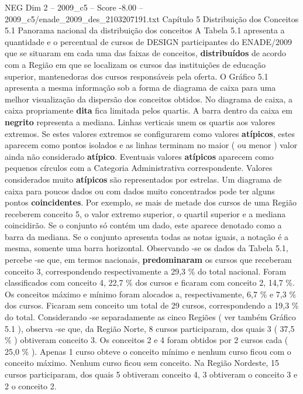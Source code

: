 \begin{textsample}{NEG Dim 2 – 2009\_c5 – Score -8.00 – 2009\_c5/enade\_2009\_des\_2103207191.txt}  \label{ex:f2_neg_008}
Capítulo 5 Distribuição dos Conceitos 5.1 Panorama nacional da distribuição dos conceitos A Tabela 5.1 apresenta a quantidade e o percentual de cursos de DESIGN participantes do ENADE/2009 que se situaram em cada uma das faixas de conceitos, \textbf{distribuídos} de acordo com a Região em que se localizam os cursos das instituições de educação superior, mantenedoras dos cursos responsáveis pela oferta.
O Gráfico 5.1 apresenta a mesma informação sob a forma de diagrama de caixa para uma melhor visualização da dispersão dos conceitos obtidos.
No diagrama de caixa, a caixa propriamente \textbf{dita} fica limitada pelos quartis.
A barra dentro da caixa em \textbf{negrito} representa a mediana.
Linhas verticais unem os quartis aos valores extremos.
Se estes valores extremos se configurarem como valores \textbf{atípicos}, estes aparecem como pontos isolados e as linhas terminam no maior ( ou menor ) valor ainda não considerado \textbf{atípico}.
Eventuais valores \textbf{atípicos} aparecem como pequenos círculos com a Categoria Administrativa correspondente.
Valores considerados muito \textbf{atípicos} são representados por estrelas.
Um diagrama de caixa para poucos dados ou com dados muito concentrados pode ter alguns pontos \textbf{coincidentes}.
Por exemplo, se mais de metade dos cursos de uma Região receberem conceito 5, o valor extremo superior, o quartil superior e a mediana coincidirão.
Se o conjunto só contém um dado, este aparece denotado como a barra da mediana.
Se o conjunto apresenta todas as notas iguais, a notação é a mesma, somente uma barra horizontal.
Observando -se os dados da Tabela 5.1, percebe -se que, em termos nacionais, \textbf{predominaram} os cursos que receberam conceito 3, correspondendo respectivamente a 29,3 \% do total nacional.
Foram classificados com conceito 4, 22,7 \% dos cursos e ficaram com conceito 2, 14,7 \%.
Os conceitos máximo e mínimo foram alocados a, respectivamente, 6,7 \% e 7,3 \% dos cursos.
Ficaram sem conceito um total de 29 cursos, correspondendo a 19,3 \% do total.
Considerando -se separadamente as cinco Regiões ( ver também Gráfico 5.1 ), observa -se que, da Região Norte, 8 cursos participaram, dos quais 3 ( 37,5 \% ) obtiveram conceito 3.
Os conceitos 2 e 4 foram obtidos por 2 cursos cada ( 25,0 \% ).
Apenas 1 curso obteve o conceito mínimo e nenhum curso ficou com o conceito máximo.
Nenhum curso ficou sem conceito.
Na Região Nordeste, 15 cursos participaram, dos quais 5 obtiveram conceito 4, 3 obtiveram o conceito 3 e 2 o conceito 2.

\end{textsample}
